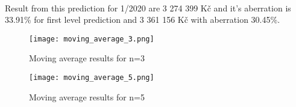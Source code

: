 \\
Result from this prediction for 1/2020 are 3 274 399 Kč and it's aberration is 33.91\% for first level prediction and 3 361 156 Kč with aberration 30.45\%.\\
\begin{figure}[h!]
    \begin{center}
        \texttt{[image: moving\_average\_3.png]}
    \end{center}
    \caption{Moving average results for n=3}
    \label{moving_average_3}
\end{figure}
\begin{figure}[h!]
    \begin{center}
        \texttt{[image: moving\_average\_5.png]}
    \end{center}
    \caption{Moving average results for n=5}
    \label{moving_average_5}
\end{figure}
